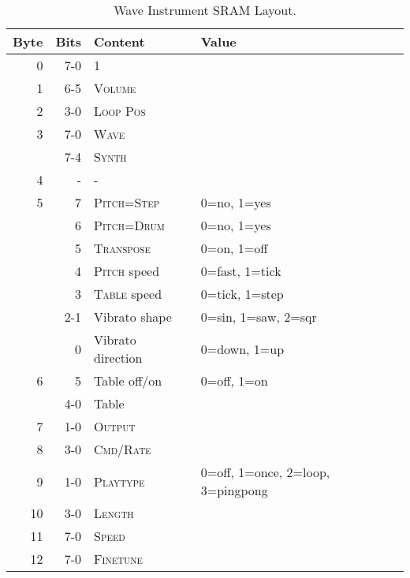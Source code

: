 \begin{table}
	\begin{center}
		\caption{Wave Instrument SRAM Layout.}
		\begin{tabular}{r|r|l|l}
			\toprule
    Byte & Bits & Content & Value \\
    \midrule
    0  & 7-0 & 1 & \\
    1  & 6-5 & \textsc{Volume} 		& \\
    2  & 3-0 & \textsc{Loop Pos} 	& \\
    3  & 7-0 & \textsc{Wave} 		& \\
       & 7-4 & \textsc{Synth} 		& \\
    4  & -   & - & \\
    5  & 7   & \textsc{Pitch=Step} 	& 0=no, 1=yes \\
       & 6   & \textsc{Pitch=Drum} 	& 0=no, 1=yes \\
       & 5   & \textsc{Transpose} 	& 0=on, 1=off \\
       & 4   & \textsc{Pitch} speed	& 0=fast, 1=tick \\
       & 3   & \textsc{Table} speed	& 0=tick, 1=step \\
       & 2-1 & Vibrato shape		& 0=sin, 1=saw, 2=sqr \\
       & 0   & Vibrato direction	& 0=down, 1=up \\
    6  & 5   & Table off/on		& 0=off, 1=on \\
       & 4-0 & Table			& \\
    7  & 1-0 & \textsc{Output}		& \\
    8  & 3-0 & \textsc{Cmd/Rate}	& \\
    9  & 1-0 & \textsc{Playtype}	& 0=off, 1=once, 2=loop, 3=pingpong \\
    10 & 3-0 & \textsc{Length}		& \\
    11 & 7-0 & \textsc{Speed}		& \\
    12 & 7-0 & \textsc{Finetune}	& \\
    \bottomrule
		\end{tabular}
	\end{center}
\end{table}

